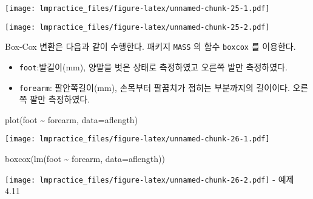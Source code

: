 \documentclass[
]{book}
\newenvironment{Shaded}{\begin{snugshade}}{\end{snugshade}}
\newcommand{\AttributeTok}[1]{\textcolor[rgb]{0.77,0.63,0.00}{#1}}
\newcommand{\FunctionTok}[1]{\textcolor[rgb]{0.00,0.00,0.00}{#1}}
\newcommand{\NormalTok}[1]{#1}
\newcommand{\OtherTok}[1]{\textcolor[rgb]{0.56,0.35,0.01}{#1}}
\newcommand{\SpecialCharTok}[1]{\textcolor[rgb]{0.00,0.00,0.00}{#1}}
\providecommand{\tightlist}{%
  \setlength{\itemsep}{0pt}\setlength{\parskip}{0pt}}
\begin{document}
\texttt{[image: lmpractice\_files/figure-latex/unnamed-chunk-25-1.pdf]}

\begin{Shaded}
\end{Shaded}

\texttt{[image: lmpractice\_files/figure-latex/unnamed-chunk-25-2.pdf]}

Box-Cox 변환은 다음과 같이 수행한다. 패키지 \texttt{MASS} 의 함수 \texttt{boxcox} 를 이용한다.

\begin{itemize}
\tightlist
\item
  \texttt{foot}:발길이(mm), 양말을 벗은 상태로 측정하였고 오른쪽 발만 측정하였다.
\item
  \texttt{forearm}: 팔안쪽길이(mm), 손목부터 팔꿈치가 접히는 부분까지의 길이이다. 오른쪽 팔만 측정하였다.
\end{itemize}

\begin{Shaded}
\begin{Highlighting}[]
\FunctionTok{plot}\NormalTok{(foot }\SpecialCharTok{\textasciitilde{}}\NormalTok{ forearm, }\AttributeTok{data=}\NormalTok{aflength)}
\end{Highlighting}
\end{Shaded}

\texttt{[image: lmpractice\_files/figure-latex/unnamed-chunk-26-1.pdf]}

\begin{Shaded}
\begin{Highlighting}[]
\FunctionTok{boxcox}\NormalTok{(}\FunctionTok{lm}\NormalTok{(foot }\SpecialCharTok{\textasciitilde{}}\NormalTok{ forearm, }\AttributeTok{data=}\NormalTok{aflength))}
\end{Highlighting}
\end{Shaded}

\texttt{[image: lmpractice\_files/figure-latex/unnamed-chunk-26-2.pdf]}
- 예제 4.11
\end{document}
